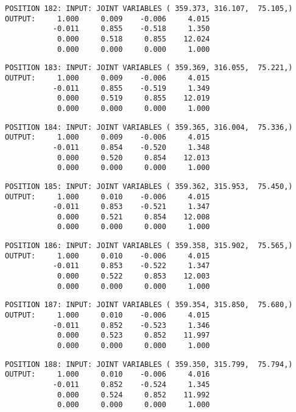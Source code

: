 \begin{verbatim}
POSITION 182: INPUT: JOINT VARIABLES ( 359.373, 316.107,  75.105,)
OUTPUT:     1.000     0.009    -0.006     4.015
           -0.011     0.855    -0.518     1.350
            0.000     0.518     0.855    12.024
            0.000     0.000     0.000     1.000
\end{verbatim} \pagebreak[1]\begin{verbatim}
POSITION 183: INPUT: JOINT VARIABLES ( 359.369, 316.055,  75.221,)
OUTPUT:     1.000     0.009    -0.006     4.015
           -0.011     0.855    -0.519     1.349
            0.000     0.519     0.855    12.019
            0.000     0.000     0.000     1.000
\end{verbatim} \pagebreak[1]\begin{verbatim}
POSITION 184: INPUT: JOINT VARIABLES ( 359.365, 316.004,  75.336,)
OUTPUT:     1.000     0.009    -0.006     4.015
           -0.011     0.854    -0.520     1.348
            0.000     0.520     0.854    12.013
            0.000     0.000     0.000     1.000
\end{verbatim} \pagebreak[1]\begin{verbatim}
POSITION 185: INPUT: JOINT VARIABLES ( 359.362, 315.953,  75.450,)
OUTPUT:     1.000     0.010    -0.006     4.015
           -0.011     0.853    -0.521     1.347
            0.000     0.521     0.854    12.008
            0.000     0.000     0.000     1.000
\end{verbatim} \pagebreak[1]\begin{verbatim}
POSITION 186: INPUT: JOINT VARIABLES ( 359.358, 315.902,  75.565,)
OUTPUT:     1.000     0.010    -0.006     4.015
           -0.011     0.853    -0.522     1.347
            0.000     0.522     0.853    12.003
            0.000     0.000     0.000     1.000
\end{verbatim} \pagebreak[1]\begin{verbatim}
POSITION 187: INPUT: JOINT VARIABLES ( 359.354, 315.850,  75.680,)
OUTPUT:     1.000     0.010    -0.006     4.015
           -0.011     0.852    -0.523     1.346
            0.000     0.523     0.852    11.997
            0.000     0.000     0.000     1.000
\end{verbatim} \pagebreak[1]\begin{verbatim}
POSITION 188: INPUT: JOINT VARIABLES ( 359.350, 315.799,  75.794,)
OUTPUT:     1.000     0.010    -0.006     4.016
           -0.011     0.852    -0.524     1.345
            0.000     0.524     0.852    11.992
            0.000     0.000     0.000     1.000
\end{verbatim} \pagebreak[1]\begin{verbatim}

\end{verbatim}
